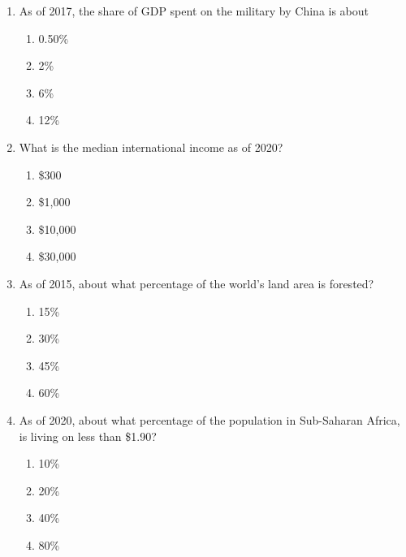 \documentclass[12pt]{article}
\begin{document}
\begin{enumerate}[label=\arabic*.]
\item As of 2017, the share of GDP spent on the military by China is about
\begin{enumerate}[label=(\alph*)]
    \item 0.50\%
    \item 2\%
    \item 6\%
    \item 12\%
\end{enumerate}
\item What is the median international income as of 2020?
\begin{enumerate}[label=(\alph*)]
    \item \$300
    \item \$1,000
    \item \$10,000
    \item \$30,000
\end{enumerate}
\item As of 2015, about what percentage of the world's land area is forested?
\begin{enumerate}[label=(\alph*)]
    \item 15\%
    \item 30\%
    \item 45\%
    \item 60\%
\end{enumerate}
\item As of 2020, about what percentage of the population in Sub-Saharan Africa, is living on less than \$1.90?
\begin{enumerate}[label=(\alph*)]
    \item 10\%
    \item 20\%
    \item 40\%
    \item 80\%
\end{enumerate}
\end{enumerate}
\end{document}
